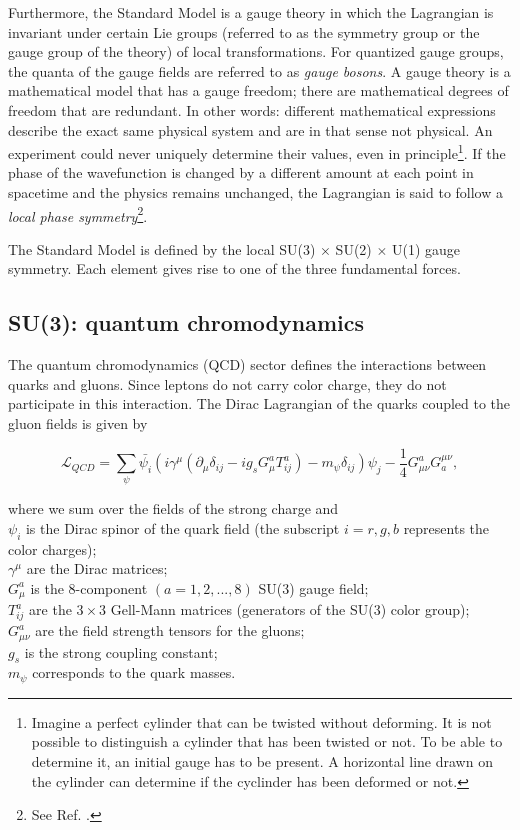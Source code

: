 Furthermore, the Standard Model is a gauge theory in which the Lagrangian is invariant under certain Lie groups (referred to as the symmetry group or the gauge group of the theory) of local transformations. For quantized gauge groups, the quanta of the gauge fields are referred to as \textit{gauge bosons}. A gauge theory is a mathematical model that has a gauge freedom; there are mathematical degrees of freedom that are redundant. In other words: different mathematical expressions describe the exact same physical system and are in that sense not physical. An experiment could never uniquely determine their values, even in principle\footnote{Imagine a perfect cylinder that can be twisted without deforming. It is not possible to distinguish a cylinder that has been twisted or not. To be able to determine it, an initial gauge has to be present. A horizontal line drawn on the cylinder can determine if the cyclinder has been deformed or not.}. If the phase of the wavefunction is changed by a different amount at each point in spacetime and the physics remains unchanged, the Lagrangian is said to follow a \textit{local phase symmetry}\footnote{See Ref. \cite{mandl2013quantum}.}.

The Standard Model is defined by the local SU(3) $\times$ SU(2) $\times$ U(1) gauge symmetry. Each element gives rise to one of the three fundamental forces.
\subsection{SU(3): quantum chromodynamics}
\label{subsec:QCD}
The quantum chromodynamics (QCD) sector defines the interactions between quarks and gluons. Since leptons do not carry color charge, they do not participate in this interaction. The Dirac Lagrangian of the quarks coupled to the gluon fields is given by


\begin{equation}
\mathcal{L}_{QCD} = \sum_{\psi} \bar{\psi_i} \left(i \gamma^\mu \left(\partial_\mu  \delta_{ij} - i g_s G^a_{\mu} T^a_{ij}\right) - m_\psi \delta_{ij} \right) \psi_j - \frac{1}{4} G^a_{\mu\nu}G^{\mu\nu}_a,
\end{equation}

where we sum over the fields of the strong charge and\\
\indent $\psi_i$ is the Dirac spinor of the quark field (the subscript $i={r,g,b}$ represents the color charges);\\
\indent $\gamma^\mu$ are the Dirac matrices;\\
\indent $G^a_\mu$ is the 8-component $\left(a=1,2,...,8\right)$ SU(3) gauge field;\\
\indent $T^a_{ij}$ are the $3\times3$ Gell-Mann matrices (generators of the SU(3) color group);\\
\indent $G^a_{\mu\nu}$ are the field strength tensors for the gluons;\\
\indent $g_s$ is the strong coupling constant;\\
\indent $m_\psi$ corresponds to the quark masses.

